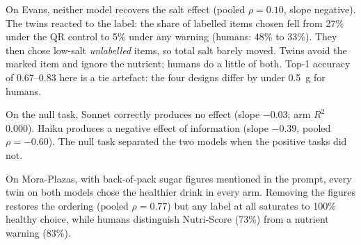 \documentclass[10pt,twocolumn]{article}
\begin{document}
On Evans, neither model recovers the salt effect (pooled $\rho{=}0.10$, slope negative). The twins reacted to the label: the share of labelled items chosen fell from 27\% under the QR control to 5\% under any warning (humans: 48\% to 33\%). They then chose low-salt \emph{unlabelled} items, so total salt barely moved. Twins avoid the marked item and ignore the nutrient; humans do a little of both. Top-1 accuracy of 0.67--0.83 here is a tie artefact: the four designs differ by under 0.5~g for humans.

On the null task, Sonnet correctly produces no effect (slope $-0.03$; arm $R^2$ 0.000). Haiku produces a negative effect of information (slope $-0.39$, pooled $\rho{=}-0.60$). The null task separated the two models when the positive tasks did not.

On Mora-Plazas, with back-of-pack sugar figures mentioned in the prompt, every twin on both models chose the healthier drink in every arm. Removing the figures restores the ordering (pooled $\rho{=}0.77$) but any label at all saturates to 100\% healthy choice, while humans distinguish Nutri-Score (73\%) from a nutrient warning (83\%).

\begin{table}[t]\centering\small
\caption{Headline scores. Effect slope: simulated arm effects regressed on human arm effects (1 = calibrated). Dispersion: simulated/human SD within arm. Cov.\ $R^2$: outcome variance explained by covariates alone, human versus twins. Interaction $r$: agreement of arm$\times$covariate coefficients. Individual: twin versus own person, against leave-one-out lookup.}
\label{tab:main}
\end{table}
\end{document}
